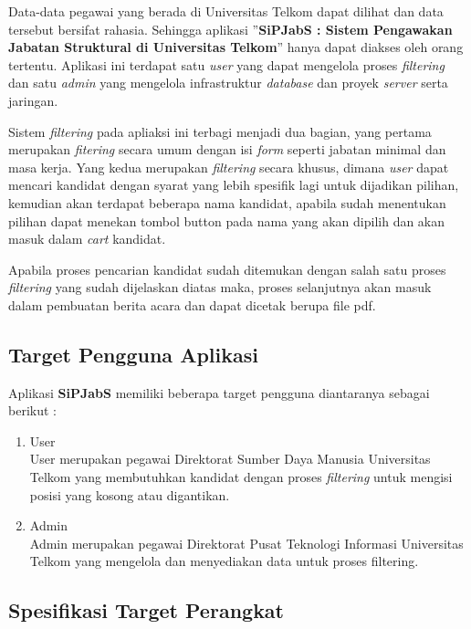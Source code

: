Data-data pegawai yang berada di Universitas Telkom dapat dilihat dan data tersebut bersifat rahasia. Sehingga aplikasi ”\textbf{SiPJabS : Sistem Pengawakan Jabatan Struktural di Universitas Telkom}” hanya dapat diakses oleh orang tertentu. Aplikasi ini terdapat satu \textit{user} yang dapat mengelola proses \textit{filtering} dan satu \textit{admin} yang mengelola infrastruktur \textit{database} dan proyek \textit{server} serta jaringan.  

Sistem \textit{filtering} pada apliaksi ini terbagi menjadi dua bagian, yang pertama merupakan \textit{fitering} secara umum dengan isi \textit{form} seperti jabatan minimal dan masa kerja. Yang kedua merupakan \textit{filtering} secara khusus, dimana \textit{user} dapat mencari kandidat dengan syarat yang lebih spesifik lagi untuk dijadikan pilihan, kemudian akan terdapat beberapa nama kandidat, apabila sudah menentukan pilihan dapat menekan tombol button pada nama yang akan dipilih dan akan masuk dalam \textit{cart} kandidat.

Apabila proses pencarian kandidat sudah ditemukan dengan salah satu proses \textit{filtering} yang sudah dijelaskan diatas maka, proses selanjutnya akan masuk dalam pembuatan berita acara dan dapat dicetak berupa file pdf.  

\subsection{Target Pengguna Aplikasi}

Aplikasi \textbf{SiPJabS} memiliki beberapa target pengguna diantaranya sebagai berikut :

\begin{enumerate}
\item User \\
User merupakan pegawai Direktorat Sumber Daya Manusia Universitas Telkom yang membutuhkan kandidat dengan proses \textit{filtering} untuk mengisi posisi yang kosong atau digantikan.

\item Admin \\
Admin merupakan pegawai Direktorat Pusat Teknologi Informasi Universitas Telkom yang mengelola dan menyediakan data untuk proses filtering.
\end{enumerate}

\subsection{Spesifikasi Target Perangkat}

